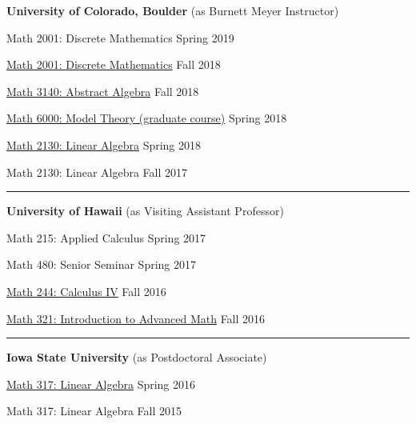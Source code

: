 \newcommand\myskip{-2mm}
\textbf{University of Colorado, Boulder} {\small (as Burnett Meyer Instructor)}

\newcommand\cors[2]{#1: #2}
\newcommand\crsu[3]{\href{#3}{#1: #2}}
\newcommand\semr[1]{\hfill \nosmall #1}
    
\vspace\myskip

\cors{Math 2001}
     {Discrete Mathematics}
\semr{Spring 2019}

\vspace\myskip

\crsu{Math 2001}
     {Discrete Mathematics}
     {https://github.com/williamdemeo/math2001-fall2018}
\semr{Fall 2018}

\vspace\myskip

\crsu{Math 3140}
     {Abstract Algebra}
     {https://github.com/williamdemeo/math3140-fall2018}
\semr{Fall 2018}

\vspace\myskip

\crsu{Math 6000}
     {Model Theory (graduate course)}
     {https://github.com/williamdemeo/math6000-spring2018}
\semr{Spring 2018}

\vspace\myskip

\crsu{Math 2130}{Linear Algebra}
     {https://github.com/williamdemeo/math2130-spring2018}
     \semr{Spring 2018}

\vspace\myskip

\cors{Math 2130}{Linear Algebra}
\semr{Fall 2017}
    

\vskip5mm
\hrule


\textbf{University of Hawaii} {\small (as Visiting Assistant Professor)}

\cors{Math 215}{Applied Calculus} \semr{Spring 2017}

\vspace\myskip
\cors{Math 480}{Senior Seminar} \semr{Spring 2017}

\vspace\myskip
\crsu{Math 244}
     {Calculus IV}
     {https://github.com/williamdemeo/math244-fall2016}
\semr{Fall 2016}

\vspace\myskip

\crsu{Math 321}{Introduction to Advanced Math}
     {https://github.com/williamdemeo/math321-fall2016}
\semr{Fall 2016}

\vskip5mm
\hrule

\textbf{Iowa State University} {\small (as Postdoctoral Associate)}

\crsu{Math 317}{Linear Algebra}{https://github.com/williamdemeo/Math317-Spring2016}
\semr{Spring 2016}

\vspace\myskip
\cors{Math 317}{Linear Algebra}
\semr{Fall 2015}

